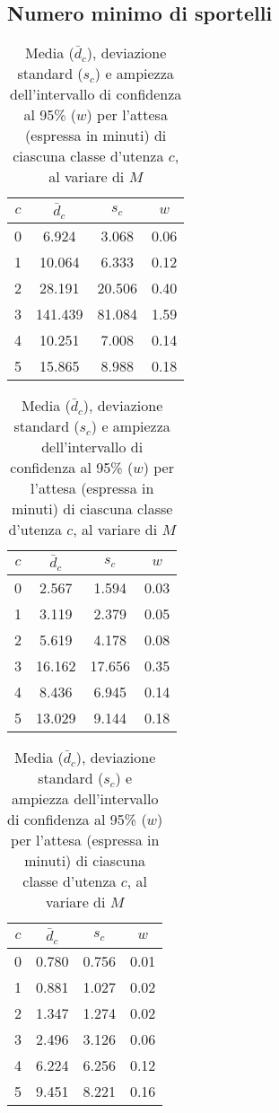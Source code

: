 \subsection*{Numero minimo di sportelli}
\captionsetup[table]{justification=centering}
\begin{table}[ht]
\centering
\begin{subtable}{0.5\textwidth}
\centering
{\tablecolors
\begin{tabular}{|c|c|c|c|}
\hline
$c$ & $\bar{d}_c$ & $s_c$ & $w$\\
\hline
0 & 6.924 & 3.068 & 0.06 \\
\hline
1 & 10.064 & 6.333 & 0.12 \\
\hline
2 & 28.191 & 20.506 & 0.40 \\
\hline
3 & 141.439 & 81.084 & 1.59 \\
\hline
4 & 10.251 & 7.008 & 0.14 \\
\hline
5 & 15.865 & 8.988 & 0.18 \\
\hline
\end{tabular}}
\caption{$M = 2$}
\end{subtable}%
\begin{subtable}{0.5\textwidth}
\centering
{\tablecolors
\begin{tabular}{|c|c|c|c|}
\hline
$c$ & $\bar{d}_c$ & $s_c$ & $w$\\
\hline
0 & 2.567 & 1.594 & 0.03 \\
\hline
1 & 3.119 & 2.379 & 0.05 \\
\hline
2 & 5.619 & 4.178 & 0.08 \\
\hline
3 & {\color{red}16.162} & {\color{red}17.656} & {\color{red}0.35} \\
\hline
4 & 8.436 & 6.945 & 0.14 \\
\hline
5 & 13.029 & 9.144 & 0.18 \\
\hline
\end{tabular}}
\caption{$M = 3$}
\label{table:esperimenti-simulazione-1b}
\end{subtable}
\begin{subtable}{0.5\textwidth}
\centering
{\tablecolors
\begin{tabular}{|c|c|c|c|}
\hline
$c$ & $\bar{d}_c$ & $s_c$ & $w$\\
\hline
0 & 0.780 & 0.756 & 0.01 \\
\hline
1 & 0.881 & 1.027 & 0.02 \\
\hline
2 & 1.347 & 1.274 & 0.02 \\
\hline
3 & 2.496 & 3.126 & 0.06 \\
\hline
4 & 6.224 & 6.256 & 0.12 \\
\hline
5 & 9.451 & 8.221 & 0.16 \\
\hline
\end{tabular}}
\caption{$M = 4$}
\end{subtable}
\caption{Media ($\bar{d}_c$), deviazione standard ($s_c$) e ampiezza dell'intervallo di confidenza al 95\% ($w$) per l'attesa (espressa in minuti) di ciascuna classe d'utenza $c$, al variare di $M$}
\label{table:esperimenti-simulazione-1}
\end{table}

